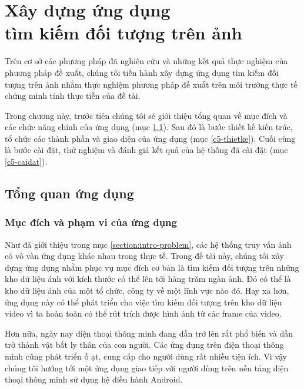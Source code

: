\chapter[Xây dựng ứng dụng\\tìm kiếm đối tượng trên ảnh]{Xây dựng ứng dụng\\tìm kiếm đối tượng trên ảnh}
\label{chapter:application}
\ifpdf
    \graphicspath{{Chapter5/Chapter5Figs/PNG/}{Chapter5/Chapter5Figs/PDF/}{Chapter5/Chapter5Figs/}}
\else
    \graphicspath{{Chapter5/Chapter5Figs/EPS/}{Chapter5/Chapter5Figs/}}
\fi
{}

Trên cơ sở các phương pháp đã nghiên cứu và những kết quả thực nghiệm của phương pháp đề xuất, chúng tôi tiến hành xây dựng ứng dụng tìm kiếm đối tượng trên ảnh nhằm thực nghiệm phương pháp đề xuất trên môi trường thực tế chứng minh tính thực tiễn của đề tài.

Trong chương này, trước tiên chúng tôi sẽ giới thiệu tổng quan về mục đích và các chức năng chính của ứng dụng (mục \ref{c5-tongquan}). Sau đó là bước thiết kế kiến trúc, tổ chức các thành phần và giao diện của ứng dụng (mục \ref{c5-thietke}). Cuối cùng là bước cài đặt, thử nghiệm và đánh giá kết quả của hệ thống đã cài đặt (mục \ref{c5-caidat}).

\section{Tổng quan ứng dụng}
\label{c5-tongquan}

	\subsection{Mục đích và phạm vi của ứng dụng}
Như đã giới thiệu trong mục \ref{section:intro-problem}, các hệ thống truy vấn ảnh có vô vàn ứng dụng khác nhau trong thực tế. Trong đề tài này, chúng tôi xây dựng ứng dụng nhằm phục vụ mục đích cơ bản là tìm kiếm đối tượng trên những kho dữ liệu ảnh với kích thước có thể lên tới hàng trăm ngàn ảnh. Đó có thể là kho dữ liệu ảnh của một tổ chức, công ty về một lĩnh vực nào đó. Hay xa hơn, ứng dụng này có thể phát triển cho việc tìm kiếm đối tượng trên kho dữ liệu video vì ta hoàn toàn có thể rút trích được hình ảnh từ các frame của video.

Hơn nữa, ngày nay điện thoại thông minh đang dần trở lên rất phổ biến và dần trở thành vật bất ly thân của con người. Các ứng dụng trên điện thoại thông minh cũng phát triển ồ ạt, cung cấp cho người dùng rất nhiều tiện ích. Vì vậy chúng tôi hướng tới một ứng dụng giao tiếp với người dùng trên nền tảng điện thoại thông minh sử dụng hệ điều hành Android.
	
